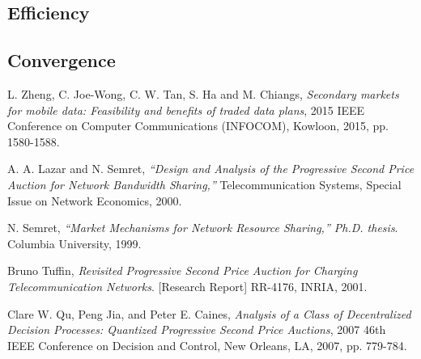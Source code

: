 \documentclass[12pt]{article}
\theoremstyle{definition}
\begin{document}
\begin{multicols}{2}
\subsection{Efficiency}

\subsection{Convergence}

\end{multicols}

\begin{thebibliography}{9}

L. Zheng, C. Joe-Wong, C. W. Tan, S. Ha and M. Chiangs, 
\textit{Secondary markets for mobile data: Feasibility and benefits of traded
data plans}, 2015 IEEE
Conference on Computer Communications (INFOCOM), Kowloon, 2015, pp. 1580-1588.

A. A. Lazar and N. Semret, 
\textit{“Design and Analysis of the Progressive Second Price Auction for Network
Bandwidth Sharing,”} Telecommunication Systems, Special Issue on Network Economics, 2000.

N. Semret, 
\textit{“Market Mechanisms for Network Resource Sharing,”
Ph.D. thesis}. 
Columbia University, 1999.

Bruno Tuffin,
\textit{Revisited Progressive Second Price Auction for Charging
Telecommunication Networks}.
[Research Report] RR-4176, INRIA, 2001.

Clare W. Qu, Peng Jia, and Peter E. Caines,
\textit{Analysis of a Class of Decentralized Decision Processes: Quantized
Progressive Second Price Auctions},
2007 46th IEEE Conference on Decision and Control, New Orleans, LA, 2007, pp.
779-784.

 
\end{thebibliography}
\end{document}
